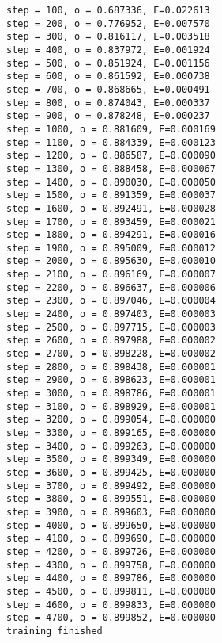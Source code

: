 \documentclass[11pt]{article}
\begin{document}
    \begin{Verbatim}[commandchars=\\\{\}]
step = 100, o = 0.687336, E=0.022613
step = 200, o = 0.776952, E=0.007570
step = 300, o = 0.816117, E=0.003518
step = 400, o = 0.837972, E=0.001924
step = 500, o = 0.851924, E=0.001156
step = 600, o = 0.861592, E=0.000738
step = 700, o = 0.868665, E=0.000491
step = 800, o = 0.874043, E=0.000337
step = 900, o = 0.878248, E=0.000237
step = 1000, o = 0.881609, E=0.000169
step = 1100, o = 0.884339, E=0.000123
step = 1200, o = 0.886587, E=0.000090
step = 1300, o = 0.888458, E=0.000067
step = 1400, o = 0.890030, E=0.000050
step = 1500, o = 0.891359, E=0.000037
step = 1600, o = 0.892491, E=0.000028
step = 1700, o = 0.893459, E=0.000021
step = 1800, o = 0.894291, E=0.000016
step = 1900, o = 0.895009, E=0.000012
step = 2000, o = 0.895630, E=0.000010
step = 2100, o = 0.896169, E=0.000007
step = 2200, o = 0.896637, E=0.000006
step = 2300, o = 0.897046, E=0.000004
step = 2400, o = 0.897403, E=0.000003
step = 2500, o = 0.897715, E=0.000003
step = 2600, o = 0.897988, E=0.000002
step = 2700, o = 0.898228, E=0.000002
step = 2800, o = 0.898438, E=0.000001
step = 2900, o = 0.898623, E=0.000001
step = 3000, o = 0.898786, E=0.000001
step = 3100, o = 0.898929, E=0.000001
step = 3200, o = 0.899054, E=0.000000
step = 3300, o = 0.899165, E=0.000000
step = 3400, o = 0.899263, E=0.000000
step = 3500, o = 0.899349, E=0.000000
step = 3600, o = 0.899425, E=0.000000
step = 3700, o = 0.899492, E=0.000000
step = 3800, o = 0.899551, E=0.000000
step = 3900, o = 0.899603, E=0.000000
step = 4000, o = 0.899650, E=0.000000
step = 4100, o = 0.899690, E=0.000000
step = 4200, o = 0.899726, E=0.000000
step = 4300, o = 0.899758, E=0.000000
step = 4400, o = 0.899786, E=0.000000
step = 4500, o = 0.899811, E=0.000000
step = 4600, o = 0.899833, E=0.000000
step = 4700, o = 0.899852, E=0.000000
training finished
    \end{Verbatim}


    
    
    
    
\end{document}
